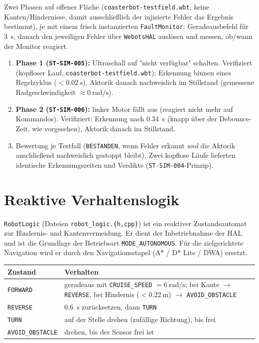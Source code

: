 \documentclass[
  a4paper,
  12pt,
  DIV=12,        %
  parskip=half,  %
  headings=small %
]{scrartcl}
\theoremstyle{definition}
\providecommand{\tightlist}{%
  \setlength{\itemsep}{0pt}\setlength{\parskip}{0pt}}
\theoremstyle{definition}
\begin{document}
Zwei Phasen auf offener Fläche (\texttt{coasterbot-testfield.wbt}, keine
Kanten/Hindernisse, damit ausschließlich der injizierte Fehler das
Ergebnis bestimmt), je mit einem frisch instanzierten
\texttt{FaultMonitor}: Geradeausbefehl für \SI{3}{\second}, danach den
jeweiligen Fehler über \texttt{WebotsHAL} auslösen und messen, ob/wann der
Monitor reagiert.

\begin{enumerate}
\tightlist
\item
  \textbf{Phase 1 (\texttt{ST-SIM-005}):} Ultraschall auf "nicht
  verfügbar" schalten. Verifiziert (kopfloser Lauf,
  \texttt{coasterbot-testfield.wbt}): Erkennung binnen eines Regelzyklus
  ($<\SI{0.02}{\second}$), Aktorik danach nachweislich im Stillstand
  (gemessene Radgeschwindigkeit $\approx \SI{0}{\radian\per\second}$).
\item
  \textbf{Phase 2 (\texttt{ST-SIM-006}):} linker Motor fällt aus (reagiert
  nicht mehr auf Kommandos). Verifiziert: Erkennung nach
  \SI{0.34}{\second} (knapp über der Debounce-Zeit, wie vorgesehen),
  Aktorik danach im Stillstand.
\item
  Bewertung je Testfall (\texttt{BESTANDEN}, wenn Fehler erkannt \emph{und}
  die Aktorik anschließend nachweislich gestoppt bleibt). Zwei kopflose
  Läufe lieferten identische Erkennungszeiten und Verdikte
  (\texttt{ST-SIM-004}-Prinzip).
\end{enumerate}

\section{Reaktive Verhaltenslogik}\label{robotlogic}

\texttt{RobotLogic} (Dateien \texttt{robot\_logic.\{h,cpp\}}) ist ein
reaktiver Zustandsautomat zur Hindernis- und
Kantenvermeidung. Er dient der Inbetriebnahme der HAL und ist die
Grundlage der Betriebsart \texttt{MODE\_AUTONOMOUS}. Für die
zielgerichtete Navigation wird er durch den Navigationsstapel (A* / D*
Lite / DWA) ersetzt.

\begin{longtable}[]{@{}p{}p{}@{}}
\toprule
\textbf{Zustand} & \textbf{Verhalten}\\
\midrule
\endhead
\texttt{FORWARD} & geradeaus mit \texttt{CRUISE\_SPEED} $= \SI{6}{\radian\per\second}$; bei Kante $\to$ \texttt{REVERSE}, bei Hindernis ($< \SI{0.22}{\meter}$) $\to$ \texttt{AVOID\_OBSTACLE}\\
\texttt{REVERSE} & \SI{0.6}{\second} zurücksetzen, dann \texttt{TURN}\\
\texttt{TURN} & auf der Stelle drehen (zufällige Richtung), bis frei\\
\texttt{AVOID\_OBSTACLE} & drehen, bis der Sensor frei ist\\
\bottomrule
\end{longtable}
\end{document}
